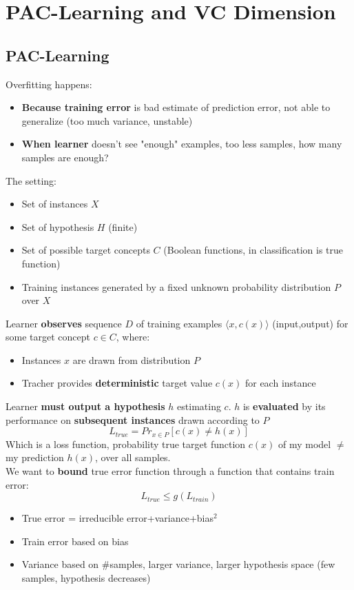 
\section{PAC-Learning and VC Dimension}
\subsection{PAC-Learning}
    Overfitting happens:
    \begin{itemize}
        \item \textbf{Because training error} is bad estimate of prediction error, not able to generalize (too much variance, unstable)
        \item \textbf{When learner} doesn't see "enough" examples, too less samples, how many samples are enough?
    \end{itemize}
    The setting:
    \begin{itemize}
        \item Set of instances $X$
        \item Set of hypothesis $H$ (finite)
        \item Set of possible target concepts $C$ (Boolean functions, in classification is true function)
        \item Training instances generated by a fixed unknown probability distribution $P$ over $X$
    \end{itemize}
    Learner \textbf{observes} sequence $D$ of training examples $\langle x,c(x)\rangle$ (input,output) for some target concept $c\in C$, where:
    \begin{itemize}
        \item Instances $x$ are drawn from distribution $P$
        \item Tracher provides \textbf{deterministic} target value $c(x)$ for each instance
    \end{itemize}
    Learner \textbf{must output a hypothesis} $h$ estimating $c$. $h$ is \textbf{evaluated} by its performance on \textbf{subsequent instances} drawn according to $P$
    $$L_{true}=Pr_{x\in P}[c(x)\neq h(x)]$$
    Which is a loss function, probability true target function $c(x)$ of my model $\neq$ my prediction $h(x)$, over all samples.\\
    We want to \textbf{bound} true error function through a function that contains train error:
    $$L_{true}\leq g(L_{train})$$
    \begin{itemize}
        \item True error = irreducible error+variance+bias$^2$
        \item Train error based on bias
        \item Variance based on \#samples, larger variance, larger hypothesis space (few samples, hypothesis decreases)
    \end{itemize}
